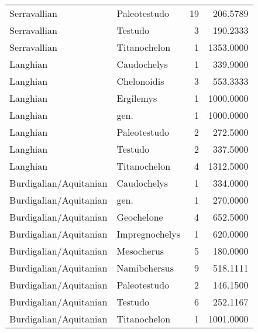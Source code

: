 \begin{longtable}[]{@{}llrr@{}}
	Serravallian & Paleotestudo & 19 & 206.5789\tabularnewline
	Serravallian & Testudo & 3 & 190.2333\tabularnewline
	Serravallian & Titanochelon & 1 & 1353.0000\tabularnewline
	Langhian & Caudochelys & 1 & 339.9000\tabularnewline
	Langhian & Chelonoidis & 3 & 553.3333\tabularnewline
	Langhian & Ergilemys & 1 & 1000.0000\tabularnewline
	Langhian & gen. & 1 & 1000.0000\tabularnewline
	Langhian & Paleotestudo & 2 & 272.5000\tabularnewline
	Langhian & Testudo & 2 & 337.5000\tabularnewline
	Langhian & Titanochelon & 4 & 1312.5000\tabularnewline
	Burdigalian/Aquitanian & Caudochelys & 1 & 334.0000\tabularnewline
	Burdigalian/Aquitanian & gen. & 1 & 270.0000\tabularnewline
	Burdigalian/Aquitanian & Geochelone & 4 & 652.5000\tabularnewline
	Burdigalian/Aquitanian & Impregnochelys & 1 & 620.0000\tabularnewline
	Burdigalian/Aquitanian & Mesocherus & 5 & 180.0000\tabularnewline
	Burdigalian/Aquitanian & Namibchersus & 9 & 518.1111\tabularnewline
	Burdigalian/Aquitanian & Paleotestudo & 2 & 146.1500\tabularnewline
	Burdigalian/Aquitanian & Testudo & 6 & 252.1167\tabularnewline
	Burdigalian/Aquitanian & Titanochelon & 1 & 1001.0000\tabularnewline
	\bottomrule
\end{longtable}